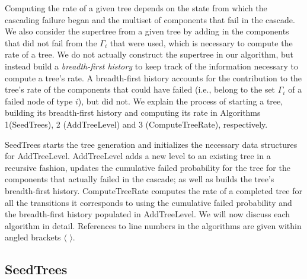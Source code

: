 \documentclass[12pt]{article}
\newcommand{\varName}[1]{\textrm{\it#1}}
\newcommand{\citeLine}[1]{$\langle \, #1 \, \rangle$}
\begin{document}
Computing the rate of a given tree depends on the state from which the cascading failure began and the multiset of components that fail in the cascade. We also consider the supertree from a given tree by adding in the components that did not fail from the $\Gamma_i$ that were used, which is necessary to compute the rate of a tree. We do not actually construct the supertree in our algorithm, but instead build a \varName{breadth-first history} to keep track of the information necessary to compute a tree's rate. A breadth-first history accounts for the contribution to the tree's rate of the components that could have failed (i.e., belong to the set $\Gamma_i$ of a failed node of type $i$), but did not. We explain the process of starting a tree, building its breadth-first history and computing its rate in Algorithms 1(SeedTrees), 2 (AddTreeLevel) and 3 (ComputeTreeRate), respectively.

SeedTrees starts the tree generation and initializes the necessary data structures for AddTreeLevel. AddTreeLevel adds a new level to an existing tree in a recursive fashion, updates the cumulative failed probability for the tree for the components that actually failed in the cascade; as well as builds the tree's breadth-first history. ComputeTreeRate computes the rate of a completed tree for all the transitions it corresponds to using the cumulative failed probability and the breadth-first history populated in AddTreeLevel. We will now discuss each algorithm in detail. References to line numbers in the algorithms are given within angled brackets \citeLine{}.

\subsection{SeedTrees}
\end{document}
